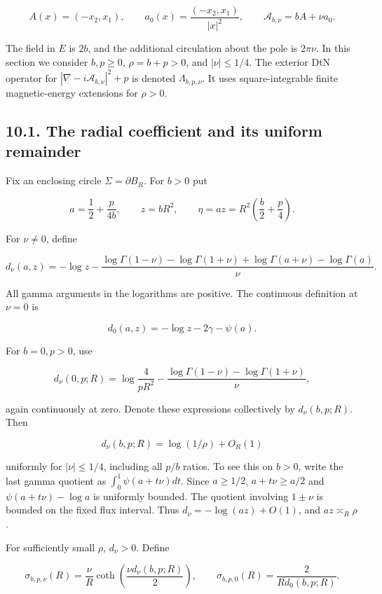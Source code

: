 \documentclass[11pt]{article}
\begin{document}
\[A(x)=(-x_2,x_1),\qquad a_0(x)=\frac{(-x_2,x_1)}{|x|^2},\qquad
\mathcal A_{b,\nu}=bA+\nu a_0.\]

The field in \(E\) is \(2b\), and the additional circulation about the
pole is \(2\pi\nu\). In this section we consider \(b,p\geq0\),
\(\rho=b+p>0\), and \(|\nu|\leq1/4\). The exterior DtN operator for
\(|\nabla-i\mathcal A_{b,\nu}|^2+p\) is denoted \(\Lambda_{b,p,\nu}\).
It uses square-integrable finite magnetic-energy extensions for
\(\rho>0\).

\subsection{10.1. The radial coefficient and its uniform
remainder}\label{the-radial-coefficient-and-its-uniform-remainder}

Fix an enclosing circle \(\Sigma=\partial B_R\). For \(b>0\) put

\[a=\frac12+\frac{p}{4b},\qquad z=bR^2,\qquad \eta=az=R^2\left(\frac b2+\frac p4\right).\]

For \(\nu\neq0\), define

\[d_\nu(a,z)=-\log z-
\frac{\log\Gamma(1-\nu)-\log\Gamma(1+\nu)+\log\Gamma(a+\nu)-\log\Gamma(a)}{\nu}.\tag{F1}\]

All gamma arguments in the logarithms are positive. The continuous
definition at \(\nu=0\) is

\[d_0(a,z)=-\log z-2\gamma-\psi(a).\]

For \(b=0,p>0\), use

\[d_\nu(0,p;R)=\log\frac4{pR^2}
-\frac{\log\Gamma(1-\nu)-\log\Gamma(1+\nu)}{\nu},\tag{F2}\]

again continuously at zero. Denote these expressions collectively by
\(d_\nu(b,p;R)\). Then

\[d_\nu(b,p;R)=\log(1/\rho)+O_R(1)\tag{F3}\]

uniformly for \(|\nu|\leq1/4\), including all \(p/b\) ratios. To see
this on \(b>0\), write the last gamma quotient as
\(\int_0^1\psi(a+t\nu)dt\). Since \(a\geq1/2\), \(a+t\nu\geq a/2\) and
\(\psi(a+t\nu)-\log a\) is uniformly bounded. The quotient involving
\(1\pm\nu\) is bounded on the fixed flux interval. Thus
\(d_\nu=-\log(az)+O(1)\), and \(az\asymp_R\rho\).

For sufficiently small \(\rho\), \(d_\nu>0\). Define

\[\sigma_{b,p,\nu}(R)=\frac{\nu}{R}\coth\!\left(\frac{\nu d_\nu(b,p;R)}2\right),\qquad
\sigma_{b,p,0}(R)=\frac2{R d_0(b,p;R)}.\tag{F4}\]
\end{document}

